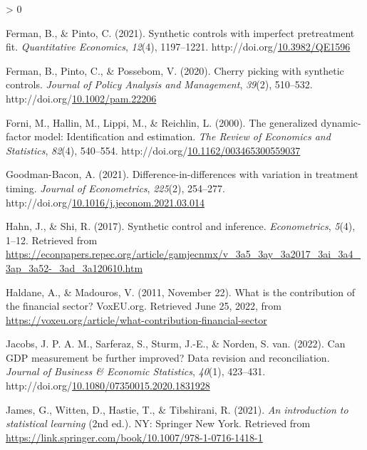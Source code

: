 \documentclass[12pt,nobind, a4paper]{reedthesis}
\newlength{\cslhangindent}
\newenvironment{CSLReferences}[2] %
{%
	\setlength{\parindent}{0pt}
	\ifodd #1 \everypar{\setlength{\hangindent}{\cslhangindent}}\ignorespaces\fi
	\ifnum #2 > 0
	\setlength{\parskip}{#2\baselineskip}
	\fi
}%
{}
\begin{document}
\begin{CSLReferences}{1}{0}
 \leavevmode\hypertarget{ref-ferman_synthetic_2021}{}%
 Ferman, B., \& Pinto, C. (2021). Synthetic controls with imperfect pretreatment fit. \emph{Quantitative Economics}, \emph{12}(4), 1197--1221. http://doi.org/\href{https://doi.org/10.3982/QE1596}{10.3982/QE1596}

 \leavevmode\hypertarget{ref-ferman_cherry_2020}{}%
 Ferman, B., Pinto, C., \& Possebom, V. (2020). Cherry picking with synthetic controls. \emph{Journal of Policy Analysis and Management}, \emph{39}(2), 510--532. http://doi.org/\href{https://doi.org/10.1002/pam.22206}{10.1002/pam.22206}

 \leavevmode\hypertarget{ref-forni_generalized_2000}{}%
 Forni, M., Hallin, M., Lippi, M., \& Reichlin, L. (2000). The generalized dynamic-factor model: Identification and estimation. \emph{The Review of Economics and Statistics}, \emph{82}(4), 540--554. http://doi.org/\href{https://doi.org/10.1162/003465300559037}{10.1162/003465300559037}

 \leavevmode\hypertarget{ref-goodman-bacon_difference_differences_2021}{}%
 Goodman-Bacon, A. (2021). Difference-in-differences with variation in treatment timing. \emph{Journal of Econometrics}, \emph{225}(2), 254--277. http://doi.org/\href{https://doi.org/10.1016/j.jeconom.2021.03.014}{10.1016/j.jeconom.2021.03.014}

 \leavevmode\hypertarget{ref-hahn_synthetic_2017}{}%
 Hahn, J., \& Shi, R. (2017). Synthetic control and inference. \emph{Econometrics}, \emph{5}(4), 1--12. Retrieved from \url{https://econpapers.repec.org/article/gamjecnmx/v_3a5_3ay_3a2017_3ai_3a4_3ap_3a52-_3ad_3a120610.htm}

 \leavevmode\hypertarget{ref-haldane_what_2011}{}%
 Haldane, A., \& Madouros, V. (2011, November 22). What is the contribution of the financial sector? {VoxEU}.org. Retrieved June 25, 2022, from \url{https://voxeu.org/article/what-contribution-financial-sector}

 \leavevmode\hypertarget{ref-jacobs_can_2022}{}%
 Jacobs, J. P. A. M., Sarferaz, S., Sturm, J.-E., \& Norden, S. van. (2022). Can {GDP} measurement be further improved? Data revision and reconciliation. \emph{Journal of Business \& Economic Statistics}, \emph{40}(1), 423--431. http://doi.org/\href{https://doi.org/10.1080/07350015.2020.1831928}{10.1080/07350015.2020.1831928}

 \leavevmode\hypertarget{ref-james_introduction_2021}{}%
 James, G., Witten, D., Hastie, T., \& Tibshirani, R. (2021). \emph{An introduction to statistical learning} (2nd ed.). {NY}: Springer New York. Retrieved from \url{https://link.springer.com/book/10.1007/978-1-0716-1418-1}


\end{CSLReferences}
\end{document}
